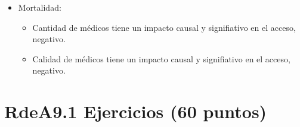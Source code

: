 \documentclass[10pt,a4paper]{article}
\begin{document}
\begin{enumerate}
{\begin{itemize}
        \item Mortalidad:
        \begin{itemize}
            \item Cantidad de médicos tiene un impacto causal y signifiativo en el acceso, negativo.
            \item Calidad de médicos tiene un impacto causal y signifiativo en el acceso, negativo.
        \end{itemize}
    \end{itemize}
    }
\end{enumerate}

\section{RdeA9.1 Ejercicios (60 puntos)}
\end{document}
